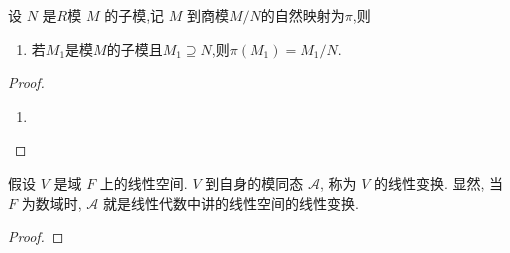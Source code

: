 \documentclass[../../main.tex]{subfiles}%
\begin{document}
\begin{proposition}\label{proposition:自然模同态的基本性质}
设 \( N \) 是$R$模 \( M \) 的子模,记 \( M \) 到商模\( M/N \)的自然映射为$\pi$,则
\begin{enumerate}[(1)]
\item\label{proposition:自然模同态的基本性质-1} 若$M_1$是模$M$的子模且$M_1\supseteq N$,则$\pi(M_1)=M_1/N.$

\end{enumerate}
\end{proposition}
\begin{proof}
\begin{enumerate}[(1)]
\item 

\end{enumerate}

\end{proof}

\begin{example}
假设 \( V \) 是域 \( F \) 上的线性空间. \( V \) 到自身的模同态 \( \mathcal{A} \), 称为 \( V \) 的线性变换. 显然, 当 \( F \) 为数域时, \( \mathcal{A} \) 就是线性代数中讲的线性空间的线性变换.
\end{example}
\begin{proof}



\end{proof}
\end{document}
